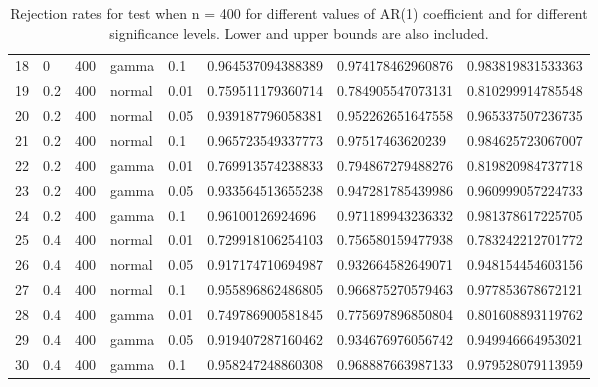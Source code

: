 \begin{table}[ht]
\begin{tabular}{rlllllll}
  18 & 0 & 400 & gamma & 0.1 & 0.964537094388389 & 0.974178462960876 & 0.983819831533363 \\ 
  19 & 0.2 & 400 & normal & 0.01 & 0.759511179360714 & 0.784905547073131 & 0.810299914785548 \\ 
  20 & 0.2 & 400 & normal & 0.05 & 0.939187796058381 & 0.952262651647558 & 0.965337507236735 \\ 
  21 & 0.2 & 400 & normal & 0.1 & 0.965723549337773 & 0.97517463620239 & 0.984625723067007 \\ 
  22 & 0.2 & 400 & gamma & 0.01 & 0.769913574238833 & 0.794867279488276 & 0.819820984737718 \\ 
  23 & 0.2 & 400 & gamma & 0.05 & 0.933564513655238 & 0.947281785439986 & 0.960999057224733 \\ 
  24 & 0.2 & 400 & gamma & 0.1 & 0.96100126924696 & 0.971189943236332 & 0.981378617225705 \\ 
  25 & 0.4 & 400 & normal & 0.01 & 0.729918106254103 & 0.756580159477938 & 0.783242212701772 \\ 
  26 & 0.4 & 400 & normal & 0.05 & 0.917174710694987 & 0.932664582649071 & 0.948154454603156 \\ 
  27 & 0.4 & 400 & normal & 0.1 & 0.955896862486805 & 0.966875270579463 & 0.977853678672121 \\ 
  28 & 0.4 & 400 & gamma & 0.01 & 0.749786900581845 & 0.775697896850804 & 0.801608893119762 \\ 
  29 & 0.4 & 400 & gamma & 0.05 & 0.919407287160462 & 0.934676976056742 & 0.949946664953021 \\ 
  30 & 0.4 & 400 & gamma & 0.1 & 0.958247248860308 & 0.968887663987133 & 0.979528079113959 \\ 
   \hline
\end{tabular}
\caption{Rejection rates for test when n = 400 for 
                   different values of AR(1) coefficient and for different 
                   significance levels. Lower and upper bounds are also 
                   included.} 
\label{rr_400}
\end{table}

